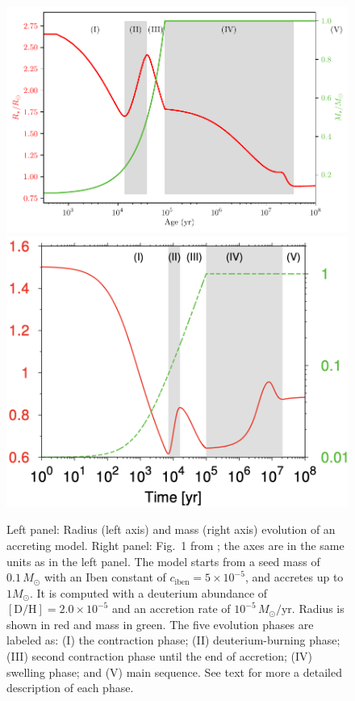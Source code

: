 \documentclass[12pt,a4paper]{article}
\newcommand{\mr}{\mathrm}
\begin{document}
\begin{figure}
  \centering
  \includegraphics[width=.55\textwidth,keepaspectratio]{acce5_mp1m1_acc.pdf}
  \includegraphics[width=.44\textwidth,keepaspectratio]{KunitomoEtAl2017_fig1.png}
  \caption{Left panel: Radius (left axis) and mass (right axis) evolution of an accreting model. Right panel: Fig.~1 from \textcite{KunitomoEtAl2017}; the axes are in the same units as in the left panel. The model starts from a seed mass of $0.1\,M_\odot$ with an Iben constant of $c_\mr{iben} = 5\times10^{-5}$, and accretes up to $1 M_\odot$. It is computed with a deuterium abundance of $[\mr{D/H}] = 2.0\times 10^{-5}$ and an accretion rate of $10^{-5}\,M_\odot/\mr{yr}$. Radius is shown in red and mass in green. The five evolution phases are labeled as: (I) the contraction phase; (II) deuterium-burning phase; (III) second contraction phase until the end of accretion; (IV) swelling phase; and (V) main sequence. See text for more a detailed description of each phase.}
  \label{fig:mass_radius_evol}
\end{figure}
\end{document}

